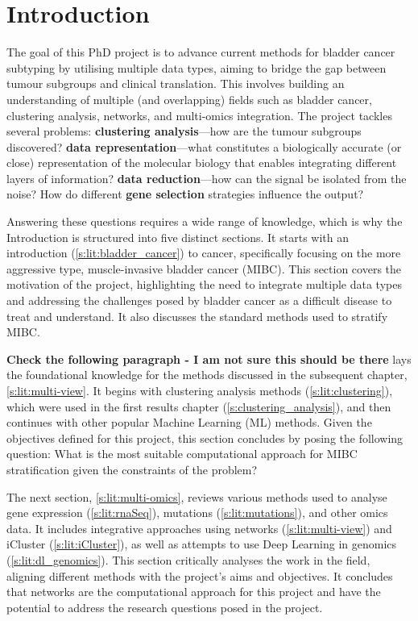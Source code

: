 

\chapter{Introduction}


The goal of this PhD project is to advance current methods for bladder cancer subtyping by utilising multiple data types, aiming to bridge the gap between tumour subgroups and clinical translation. This involves building an understanding of multiple (and overlapping) fields such as bladder cancer, clustering analysis, networks, and multi-omics integration. The project tackles several problems: \textbf{clustering analysis}—how are the tumour subgroups discovered? \textbf{data representation}—what constitutes a biologically accurate (or close) representation of the molecular biology that enables integrating different layers of information? \textbf{data reduction}—how can the signal be isolated from the noise? How do different \textbf{gene selection} strategies influence the output?

Answering these questions requires a wide range of knowledge, which is why the Introduction is structured into five distinct sections. It starts with an introduction (\cref{s:lit:bladder_cancer}) to cancer, specifically focusing on the more aggressive type, muscle-invasive bladder cancer (MIBC). This section covers the motivation of the project, highlighting the need to integrate multiple data types and addressing the challenges posed by bladder cancer as a difficult disease to treat and understand. It also discusses the standard methods used to stratify MIBC.

\textbf{Check the following paragraph - I am not sure this should be there }
 lays the foundational knowledge for the methods discussed in the subsequent chapter, \cref{s:lit:multi-view}. It begins with clustering analysis methods (\cref{s:lit:clustering}), which were used in the first results chapter (\cref{s:clustering_analysis}), and then continues with other popular Machine Learning (ML) methods. Given the objectives defined for this project, this section concludes by posing the following question: What is the most suitable computational approach for MIBC stratification given the constraints of the problem?

The next section, \cref{s:lit:multi-omics}, reviews various methods used to analyse gene expression (\cref{s:lit:rnaSeq}), mutations (\cref{s:lit:mutations}), and other omics data. It includes integrative approaches using networks (\cref{s:lit:multi-view}) and iCluster (\cref{s:lit:iCluster}), as well as attempts to use Deep Learning in genomics (\cref{s:lit:dl_genomics}). This section critically analyses the work in the field, aligning different methods with the project's aims and objectives. It concludes that networks are the computational approach for this project and have the potential to address the research questions posed in the project.

